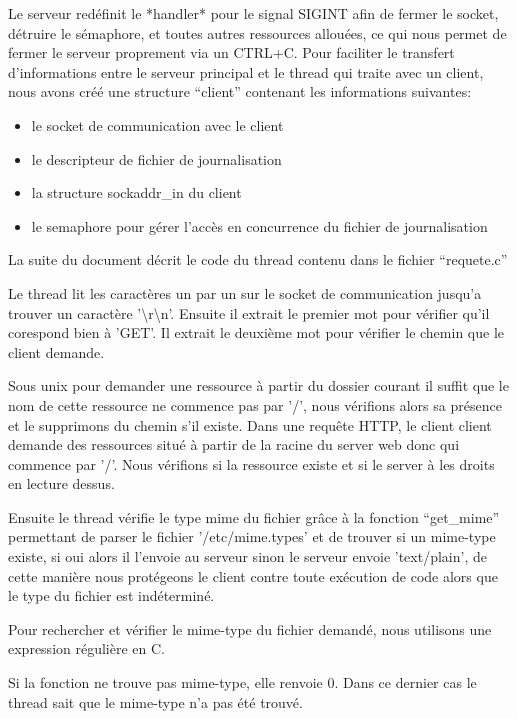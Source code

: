 \documentclass{article}
\begin{document}
Le serveur redéfinit le *handler* pour le signal SIGINT afin de fermer le socket, détruire le sémaphore, et toutes autres ressources allouées, ce qui nous permet de fermer le serveur proprement via un CTRL+C.
Pour faciliter le transfert d'informations entre le serveur principal et le thread qui traite avec un client, nous avons créé une structure ``client'' contenant les informations suivantes:
\begin{itemize}
\item le socket de communication avec le client
\item le descripteur de fichier de journalisation
\item la structure sockaddr\_in du client
\item le semaphore pour gérer l'accès en concurrence du fichier de journalisation
\end{itemize}

La suite du document décrit le code du thread contenu dans le fichier ``requete.c''

Le thread lit les caractères un par un sur le socket de communication jusqu'a trouver un caractère '\textbackslash{}r\textbackslash{}n'.
Ensuite il extrait le premier mot pour vérifier qu'il corespond bien à 'GET'.
Il extrait le deuxième mot pour vérifier le chemin que le client demande. 

Sous unix pour demander une ressource à partir du dossier courant il suffit que le nom de cette ressource ne commence pas par '/', nous vérifions alors sa présence et le
supprimons du chemin s'il existe. Dans une requête HTTP, le client client demande des ressources situé à partir de la racine du server web donc qui commence par '/'. Nous vérifions si la ressource existe et si le server à les droits en lecture dessus.\hbox{}

Ensuite le thread vérifie le type mime du fichier grâce à la fonction ``get\_mime'' permettant de parser le fichier '/etc/mime.types' et de trouver si un mime-type existe, si oui alors
il l'envoie au serveur sinon le serveur envoie 'text/plain', de cette manière nous protégeons le client contre toute exécution de code alors que le type du fichier est indéterminé.\hbox{}

Pour rechercher et vérifier le mime-type du fichier demandé, nous utilisons une expression régulière en C.\hbox{}

Si la fonction ne trouve pas mime-type, elle renvoie 0. Dans ce dernier cas le thread sait que le mime-type n'a pas été trouvé.\hbox{}
\end{document}
